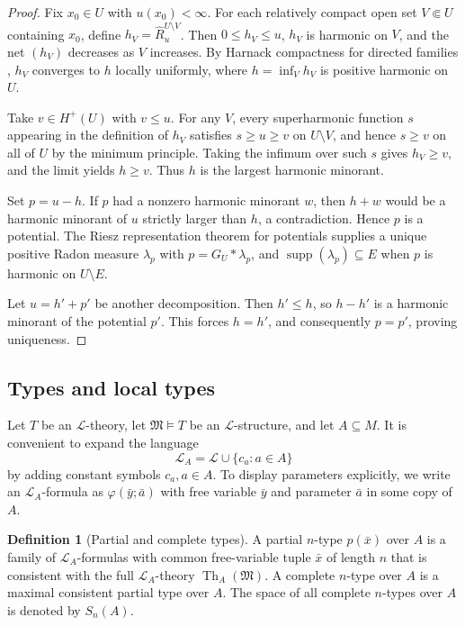 \documentclass{amsart}
\theoremstyle{definition}
\newtheorem{definition}{Definition}[section]
\theoremstyle{remark}
\numberwithin{equation}{section}
\begin{document}
\begin{proof}
	Fix $x_0\in U$ with $u(x_0)<\infty$. For each relatively compact open set
	$V\Subset U$ containing $x_0$, define $h_V = \widehat R_u^{U\setminus V}$.
	Then $0\le h_V\le u$, $h_V$ is harmonic on $V$, and the net $(h_V)$ decreases
	as $V$ increases. By Harnack compactness for directed families \cite[Lemma~2]{CC1963axiomatic},
	$h_V$ converges to $h$ locally uniformly, where $h=\inf_V h_V$ is positive harmonic on $U$.
	
	Take $v\in H^+(U)$ with $v\le u$. For any $V$, every superharmonic
	function $s$ appearing in the definition of $h_V$ satisfies
	$s\ge u\ge v$ on $U\setminus V$, and hence $s\ge v$ on all of $U$
	by the minimum principle. Taking the infimum over such $s$ gives
	$h_V\ge v$, and the limit yields $h\ge v$. Thus $h$ is the largest
	harmonic minorant.
	
	Set $p=u-h$. If $p$ had a nonzero harmonic minorant $w$, then
	$h+w$ would be a harmonic minorant of $u$ strictly larger than $h$,
	a contradiction. Hence $p$ is a potential. The Riesz representation theorem for potentials supplies a unique positive Radon
	measure $\lambda_p$ with $p = G_U * \lambda_p$, and
	$\operatorname{supp}(\lambda_p)\subseteq E$ when $p$ is harmonic
	on $U\setminus E$.
	
	Let $u = h' + p'$ be another decomposition.
	Then $h'\le h$, so $h-h'$ is a harmonic minorant of the potential
	$p'$. This forces $h=h'$, and consequently $p=p'$, proving uniqueness.
\end{proof}

\subsection{Types and local types}
Let $T$ be an $\mathcal L$-theory, let $\mathfrak M\models T$ be an $\mathcal L$-structure, and let $A\subseteq M$. It is convenient to expand the language
$$\mathcal L_A = \mathcal L \cup \{c_a: a \in A\}$$
by adding constant symbols $c_a,a\in A$. To display parameters explicitly, we write an $\mathcal L_A$-formula as $\varphi(\bar y;\bar a)$ with free variable $\bar y$ and parameter $\bar a$ in some copy of $A$.  

\begin{definition}[Partial and complete types] A {partial $n$-type} $p(\bar x)$ over $A$ is a family of $\mathcal L_A$-formulas with common free-variable tuple $\bar x$ of length $n$ that is consistent with the full $\mathcal L_A$-theory $\operatorname{Th}_A(\mathfrak M)$. A {complete $n$-type} over $A$ is a maximal consistent partial type over $A$. The space of all complete $n$-types over $A$ is denoted by $S_n(A)$.
\end{definition}
\end{document}
